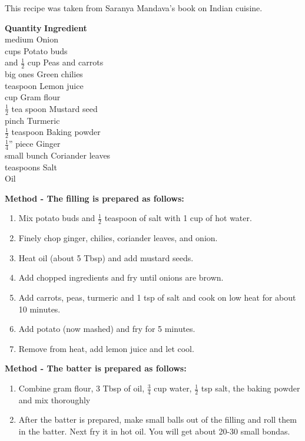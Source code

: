   This recipe was taken from Saranya Mandava's book on Indian cuisine.

\begin{tabbing}
\hspace{1.0cm}  \={\bf Quantity}   \hspace{3.0cm} \={\bf Ingredient}\\
 medium   \>Onion \\
 cups   \>Potato buds \\
 and $\frac{1}{2}$ cup   \>Peas and carrots \\
 big ones   \>Green chilies \\
 teaspoon   \>Lemon juice \\
 cup   \>Gram flour \\
\>$\frac{1}{2}$ tea spoon   \>Mustard seed \\
\>pinch   \>Turmeric \\
\>$\frac{1}{2}$ teaspoon   \>Baking powder \\
\>$\frac{1}{4}$'' piece  \>Ginger \\
 small bunch   \>Coriander leaves \\
 teaspoons   \>Salt \\
\>   \>Oil \\
\end{tabbing}

  {\bf Method - The filling is prepared as follows:}
\begin{enumerate}
   \item  Mix potato buds and $\frac{1}{2}$ teaspoon of salt with 1 cup of hot water.
   \item Finely chop ginger, chilies, coriander leaves, and onion.
   \item Heat oil (about 5 Tbsp) and add mustard seeds.
   \item Add chopped ingredients and fry until onions are brown.
   \item Add carrots, peas, turmeric and 1 tsp of salt and cook  on  low
      heat for about 10 minutes.
   \item Add potato (now mashed) and fry for 5 minutes.
   \item Remove from heat, add lemon juice and let cool.
\end{enumerate}

{\bf Method - The batter is prepared as follows:}

\begin{enumerate}
   \item  Combine  gram  flour,  3  Tbsp  of  oil,  $\frac{3}{4}$  cup water, $\frac{1}{2}$
      tsp salt, the baking powder and mix thoroughly
\item  After the batter is prepared, make small balls out of the filling and  roll  them
in the batter. Next fry it in hot oil. You will get about 20-30 small bondas.
\end{enumerate}


